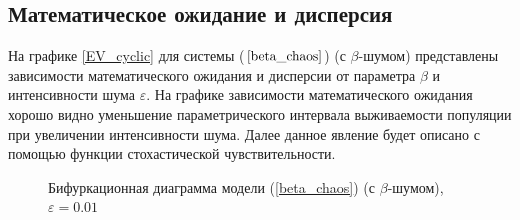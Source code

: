 \subsection{Математическое ожидание и дисперсия}

    На графике \ref{EV_cyclic} для системы (\(\ref{beta_chaos}\)) (с \(\beta\)-шумом) представлены зависимости математического ожидания и дисперсии от параметра \(\beta\) и интенсивности шума \(\varepsilon\). На графике зависимости математического ожидания хорошо видно уменьшение параметрического интервала выживаемости популяции при увеличении интенсивности шума. Далее данное явление будет описано с помощью функции стохастической чувствительности.

    \begin{figure}
        \centering
        
        \captionsetup{justification=centering}
        \caption{Бифуркационная диаграмма модели (\ref{beta_chaos}) (с \(\beta\)-шумом), \(\varepsilon = 0.01\)}
    \end{figure}
        
        
